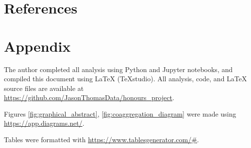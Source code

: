\documentclass[hidelinks]{article}
\begin{document}
\newpage

\section{References}
\printbibliography[heading=none]
\citereset

\newpage

\section{Appendix}

The author completed all analysis using Python and Jupyter notebooks, and compiled this document using LaTeX (TeXstudio). All analysis, code, and LaTeX source files are available at \url{https://github.com/JasonThomasData/honours_project}.

Figures \ref{fig:graphical_abstract}, \ref{fig:coaggregation_diagram} were made using \url{https://app.diagrams.net/}.

Tables were formatted with \url{https://www.tablesgenerator.com/#}.
\end{document}

